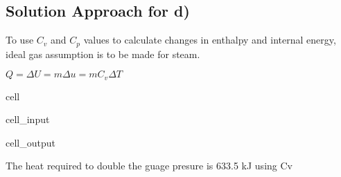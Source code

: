 \documentclass[letterpaper,10pt,english]{jupyterBook}
\begin{document}
\subsection{Solution Approach for d)}
\label{\detokenize{notebooks/Chapter5/CH5-Q1:solution-approach-for-d}}
\sphinxAtStartPar
To use \(C_v\) and \(C_p\) values to calculate changes in enthalpy and internal energy, ideal gas assumption is to be made for steam.

\sphinxAtStartPar
\(Q=\Delta U=m\Delta u=mC_v\Delta T\)

\begin{sphinxuseclass}{cell}\begin{sphinxVerbatimInput}

\begin{sphinxuseclass}{cell_input}
\begin{sphinxVerbatim}[commandchars=\\\{\}]
   
         
\end{sphinxVerbatim}

\end{sphinxuseclass}\end{sphinxVerbatimInput}
\begin{sphinxVerbatimOutput}

\begin{sphinxuseclass}{cell_output}
\begin{sphinxVerbatim}[commandchars=\\\{\}]
The heat required to double the guage presure is 633.5 kJ using C\PYGZus{}v
\end{sphinxVerbatim}

\end{sphinxuseclass}\end{sphinxVerbatimOutput}

\end{sphinxuseclass}
\sphinxstepscope
\end{document}
